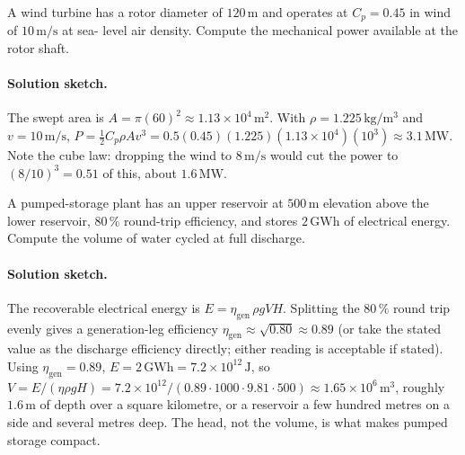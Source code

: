 \begin{exercise}
A wind turbine has a rotor diameter of $120\,\si{\meter}$ and operates
at $C_{p} = 0.45$ in wind of $10\,\si{\meter\per\second}$ at sea-
level air density. Compute the mechanical power available at the
rotor shaft.
\paragraph{Solution sketch.}
The swept area is $A = \pi(60)^2 \approx 1.13\times10^4\,\si{\meter
\squared}$. With $\rho = 1.225\,\si{\kilogram\per\meter\cubed}$ and
$v = 10\,\si{\meter\per\second}$, $P = \tfrac{1}{2}C_p\rho A v^3 =
0.5(0.45)(1.225)(1.13\times10^4)(10^3) \approx 3.1\,\si{\mega\watt}$.
Note the cube law: dropping the wind to $8\,\si{\meter\per\second}$
would cut the power to $(8/10)^3 = 0.51$ of this, about $1.6\,\si{\mega
\watt}$.
\end{exercise}

\begin{exercise}
A pumped-storage plant has an upper reservoir at $500\,\si{\meter}$
elevation above the lower reservoir, $80\,\%$ round-trip efficiency,
and stores $2\,\si{\giga\watt\hour}$ of electrical energy. Compute
the volume of water cycled at full discharge.
\paragraph{Solution sketch.}
The recoverable electrical energy is $E = \eta_{\text{gen}}\,\rho g V H$.
Splitting the $80\,\%$ round trip evenly gives a generation-leg
efficiency $\eta_{\text{gen}} \approx \sqrt{0.80} \approx 0.89$ (or take
the stated value as the discharge efficiency directly; either reading is
acceptable if stated). Using $\eta_{\text{gen}} = 0.89$, $E = 2\,\si{
\giga\watt\hour} = 7.2\times10^{12}\,\si{\joule}$, so $V = E/(\eta\rho g
H) = 7.2\times10^{12}/(0.89\cdot1000\cdot9.81\cdot500) \approx 1.65
\times10^{6}\,\si{\meter\cubed}$, roughly $1.6\,\si{\meter}$ of
depth over a square kilometre, or a reservoir a few hundred metres on a
side and several metres deep. The head, not the volume, is what makes
pumped storage compact.
\end{exercise}

